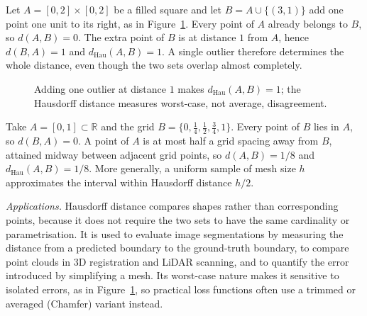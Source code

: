 \documentclass[a4paper, 12pt]{book}
\begin{document}
\begin{example}
    Let $A=[0,2]\times[0,2]$ be a filled square and let $B=A\cup\{(3,1)\}$ add one point one unit to its right, as in Figure~\ref{fig:hausdorff-outlier}. Every point of $A$ already belongs to $B$, so $d(A,B)=0$. The extra point of $B$ is at distance $1$ from $A$, hence $d(B,A)=1$ and $d_{\mathrm{Hau}}(A,B)=1$. A single outlier therefore determines the whole distance, even though the two sets overlap almost completely.
\end{example}

\begin{figure}[htbp]
\centering
{}
\caption{Adding one outlier at distance $1$ makes $d_{\mathrm{Hau}}(A,B)=1$; the Hausdorff distance measures worst-case, not average, disagreement.}
\label{fig:hausdorff-outlier}
\end{figure}

\begin{example}
    Take $A=[0,1]\subset\mathbb{R}$ and the grid $B=\{0,\tfrac14,\tfrac12,\tfrac34,1\}$. Every point of $B$ lies in $A$, so $d(B,A)=0$. A point of $A$ is at most half a grid spacing away from $B$, attained midway between adjacent grid points, so $d(A,B)=1/8$ and $d_{\mathrm{Hau}}(A,B)=1/8$. More generally, a uniform sample of mesh size $h$ approximates the interval within Hausdorff distance $h/2$.
\end{example}

\emph{Applications.} Hausdorff distance compares shapes rather than corresponding points, because it does not require the two sets to have the same cardinality or parametrisation. It is used to evaluate image segmentations by measuring the distance from a predicted boundary to the ground-truth boundary, to compare point clouds in 3D registration and LiDAR scanning, and to quantify the error introduced by simplifying a mesh. Its worst-case nature makes it sensitive to isolated errors, as in Figure~\ref{fig:hausdorff-outlier}, so practical loss functions often use a trimmed or averaged (Chamfer) variant instead.
\end{document}
